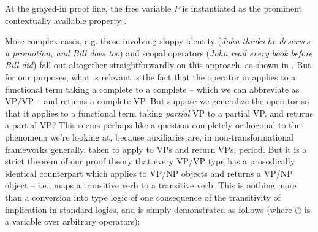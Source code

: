 \documentclass[output=paper,colorlinks,citecolor=brown]{langscibook}
\begin{document}
\noindent At the grayed-in proof line, the free variable $P$ is instantiated as
the prominent contextually available property .

More complex cases, e.g. those involving sloppy identity (\textit{John thinks
he deserves a promotion, and Bill does too}) and scopal operators
(\textit{John read every book before Bill did}) fall out altogether
straightforwardly on this approach, as shown in
\citet[236--238]{kubota-levine-pseudo}. But for our purposes, what is relevant
is the fact that the operator in  applies to a functional
term taking a complete  to a complete  -- which we can
abbreviate as VP/VP -- and returns a complete VP. But suppose
we generalize the operator so that it applies to a functional term
taking \emph{partial} VP to a partial VP, and returns a partial VP?
This seems perhaps like a question completely orthogonal to the
phenomena we're looking at, because auxiliaries are, in
non-transformational frameworks generally, taken to apply to VPs and
return VPs, period. But it is a strict theorem of our proof theory
that every VP/VP type has a prosodically identical counterpart which
applies to VP/NP objects and returns a VP/NP object -- i.e., maps a
transitive verb to a transitive verb. This is nothing more than a
conversion into type logic of one consequence of the transitivity of
implication in standard logics, and is simply demonstrated as follows
(where $\bigcirc$ is a variable over arbitrary operators):
\end{document}
